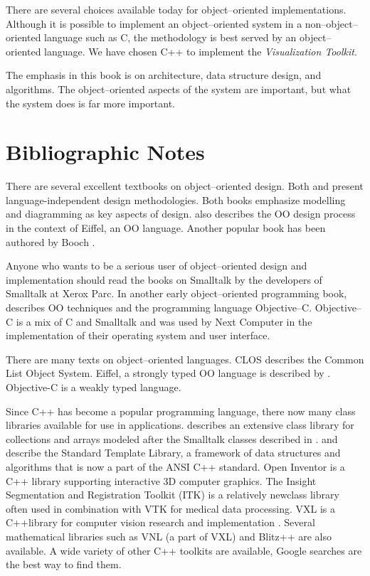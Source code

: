 There are several choices available today for object--oriented implementations. Although it is possible to implement an object--oriented system in a non--object--oriented language such as C, the methodology is best served by an object--oriented language. We have chosen C++ to implement the \emph{Visualization Toolkit}.

The emphasis in this book is on architecture, data structure design, and algorithms. The object--oriented aspects of the system are important, but what the system does is far more important.

\section{Bibliographic Notes}
There are several excellent textbooks on object--oriented design.
Both \cite{Rumbaugh91} and \cite{Birtwistle79} present language-independent design methodologies.
Both books emphasize modelling and diagramming as key aspects of design.
\cite{Meyer88} also describes the OO design process in the context of Eiffel, an OO language.
Another popular book has been authored by Booch \cite{Booch91}.

Anyone who wants to be a serious user of object--oriented design and implementation should read the books on Smalltalk \cite{Goldberg83} \cite{Goldberg84} by the developers of Smalltalk at Xerox Parc.
In another early object--oriented programming book, \cite{Cox86} describes OO techniques and the programming language Objective--C.
Objective--C is a mix of C and Smalltalk and was used by Next Computer in the implementation of their operating system and user interface.

There are many texts on object--oriented languages. CLOS \cite{Keene89} describes the Common List Object System. Eiffel, a strongly typed OO language is described by \cite{Meyer88} .
Objective-C \cite{Cox86} is a weakly typed language.

Since C++ has become a popular programming language, there now many class libraries available for use in applications.
\cite{Gorlen90} describes an extensive class library for collections and arrays modeled after the Smalltalk classes described in \cite{Goldberg83} .
\cite{Stepanov94} and \cite{Musser94} describe the Standard Template Library, a framework of data structures and algorithms that is now a part of the ANSI C++ standard. Open Inventor \cite{Inventor} is a C++ library supporting interactive 3D computer graphics.
The Insight Segmentation and Registration Toolkit (ITK) is a relatively newclass library often used in combination with VTK \cite{ITK} for medical data processing. VXL is a C++library for computer vision research and implementation \cite{VXL}.
Several mathematical libraries such as VNL (a part of VXL) and Blitz++ \cite{Blitz} are also available. A wide variety of other C++ toolkits are available, Google searches \cite{Google} are the best way to find them.

